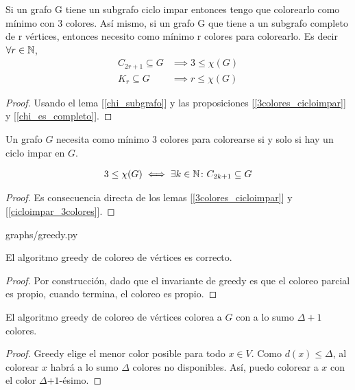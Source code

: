 \begin{lemma}\label{cicloimpar_3colores}
  Si un grafo G tiene un subgrafo ciclo impar entonces tengo que colorearlo como mínimo con 3 colores.
  Así mismo, si un grafo G que tiene a un subgrafo completo de r vértices, entonces necesito como mínimo r colores para colorearlo. Es decir $\forall r \in \mathbb{N}$,
  \begin{align}
    C_{2r+1} \subseteq G &\implies 3 \le \chi(G)\\
    K_r \subseteq G      &\implies r \le \chi(G)
  \end{align}
\end{lemma}
\begin{proof}
  Usando el lema [\ref{chi_subgrafo}] y las proposiciones [\ref{3colores_cicloimpar}] y [\ref{chi_es_completo}].
\end{proof}

\begin{proposition}
  Un grafo $G$ necesita como mínimo 3 colores para colorearse si y solo si hay un ciclo impar en $G$.
  
  \begin{align}
    3 \le \chi(G) \iff \exists k \in \mathbb{N} \colon C_{2k+1} \subseteq G
  \end{align}
\end{proposition}

\begin{proof}
  Es consecuencia directa de los lemas [\ref{3colores_cicloimpar}] y [\ref{cicloimpar_3colores}].
\end{proof}


\begin{lstinputlisting}[language=python]{graphs/greedy.py}
\end{lstinputlisting}

\begin{proposition}
  El algoritmo greedy de coloreo de vértices es correcto.
\end{proposition}
\begin{proof}
  Por construcción, dado que el invariante de greedy es que el coloreo parcial es propio, cuando termina, el coloreo es propio.
\end{proof}

\begin{proposition}
  El algoritmo greedy de coloreo de vértices colorea a $G$ con a lo sumo $\Delta + 1$ colores.
\end{proposition}

\begin{proof}
  Greedy elige el menor color posible para todo $x\in V$.
  Como $d(x) \le \Delta$, al colorear $x$ habrá  a lo sumo $\Delta$ colores no disponibles. Así, puedo colorear a $x$ con el color $\Delta$+$1$-ésimo.
\end{proof}

